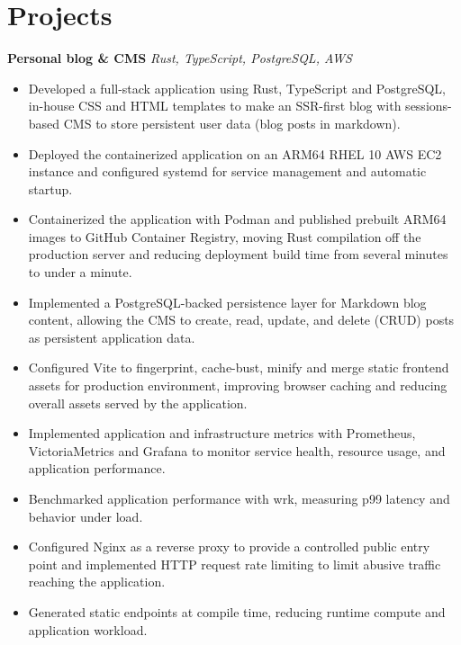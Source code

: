 \section{Projects}

\textbf{ Personal blog \& CMS }
\hfill
\textit{\small Rust, TypeScript, PostgreSQL, AWS}

\begin{itemize}
    \item Developed a full-stack application using Rust, TypeScript and PostgreSQL, in-house CSS and HTML templates to make an SSR-first blog with sessions-based CMS to store persistent user data (blog posts in markdown).
    
    \item Deployed the containerized application on an ARM64 RHEL 10 AWS EC2 instance and configured systemd for service management and automatic startup.
    
    \item Containerized the application with Podman and published prebuilt ARM64 images to GitHub Container Registry, moving Rust compilation off the production server and reducing deployment build time from several minutes to under a minute.

    \item Implemented a PostgreSQL-backed persistence layer for Markdown blog content, allowing the CMS to create, read, update, and delete (CRUD) posts as persistent application data.
    
    \item Configured Vite to fingerprint, cache-bust, minify and merge static frontend assets for production environment, improving browser caching and reducing overall assets served by the application.

    \item Implemented application and infrastructure metrics with Prometheus, VictoriaMetrics and Grafana to monitor service health, resource usage, and application performance.
    
    \item Benchmarked application performance with wrk, measuring p99 latency and behavior under load.
    
    \item Configured Nginx as a reverse proxy to provide a controlled public entry point and implemented HTTP request rate limiting to limit abusive traffic reaching the application.
    
    \item Generated static endpoints at compile time, reducing runtime compute and application workload. 
\end{itemize}